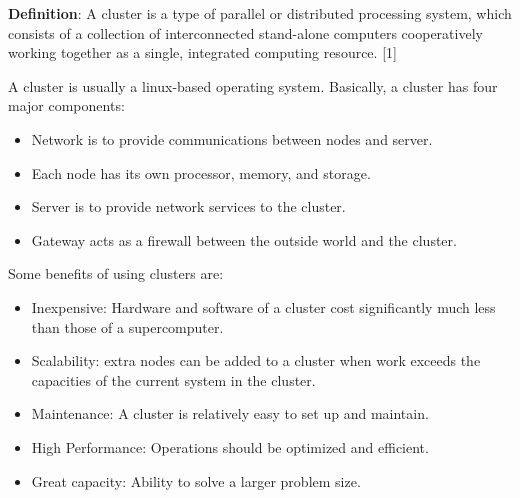 \documentclass[letterpaper,10pt,openany,oneside]{sphinxmanual}
\begin{document}
\textbf{Definition}: A cluster is a type of parallel or distributed processing system, which consists of a collection of interconnected stand-alone computers cooperatively working together as a single, integrated computing resource. {[}1{]}

A cluster is usually a linux-based operating system. Basically, a cluster has four major components:
\begin{itemize}
\item {} 
Network is to provide communications between nodes and server.

\item {} 
Each node has its own processor, memory, and storage.

\item {} 
Server is to provide network services to the cluster.

\item {} 
Gateway acts as a firewall between the outside world and the cluster.

\end{itemize}

Some benefits of using clusters are:
\begin{itemize}
\item {} 
Inexpensive: Hardware and software of a cluster cost significantly much less than those of a supercomputer.

\item {} 
Scalability: extra nodes can be added to a cluster when work exceeds the capacities of the current system in the cluster.

\item {} 
Maintenance: A cluster is relatively easy to set up and maintain.

\item {} 
High Performance: Operations should be optimized and efficient.

\item {} 
Great capacity: Ability to solve a larger problem size.

\end{itemize}
\end{document}
